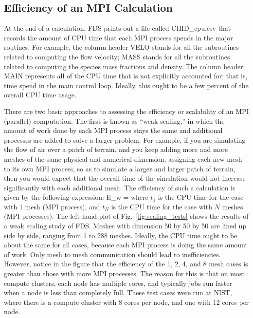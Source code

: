 \documentclass[11pt]{book}
\begin{document}
\subsection{Efficiency of an MPI Calculation}

At the end of a calculation, FDS prints out a file called {\ct CHID\_cpu.csv} that records the amount of CPU time that each MPI process spends in the major routines. For example, the column header {\ct VELO} stands for all the subroutines related to computing the flow velocity; {\ct MASS} stands for all the subroutines related to computing the species mass fractions and density. The column header {\ct MAIN} represents all of the CPU time that is not explicitly accounted for; that is, time spend in the main control loop. Ideally, this ought to be a few percent of the overall CPU time usage.

There are two basic approaches to assessing the efficiency or scalability of an MPI (parallel) computation. The first is known as ``weak scaling,'' in which the amount of work done by each MPI process stays the same and additional processes are added to solve a larger problem. For example, if you are simulating the flow of air over a patch of terrain, and you keep adding more and more meshes of the same physical and numerical dimension, assigning each new mesh to its own MPI process, so as to simulate a larger and larger patch of terrain, then you would expect that the overall time of the simulation would not increase significantly with each additional mesh. The efficiency of such a calculation is given by the following expression:
\be
   E_{\rm w} = 
\ee
where $t_1$ is the CPU time for the case with 1 mesh (MPI process), and $t_N$ is the CPU time for the case with $N$ meshes (MPI processes). The left hand plot of Fig.~\ref{fig:scaling_tests} shows the results of a weak scaling study of FDS. Meshes with dimension 50 by 50 by 50 are lined up side by side, ranging from 1 to 288 meshes. Ideally, the CPU time ought to be about the same for all cases, because each MPI process is doing the same amount of work. Only mesh to mesh communication should lead to inefficiencies. However, notice in the figure that the efficiency of the 1, 2, 4, and 8 mesh cases is greater than those with more MPI processes. The reason for this is that on most compute clusters, each node has multiple cores, and typically jobs run faster when a node is less than completely full. These test cases were run at NIST, where there is a compute cluster with 8 cores per node, and one with 12 cores per node.
\end{document}
